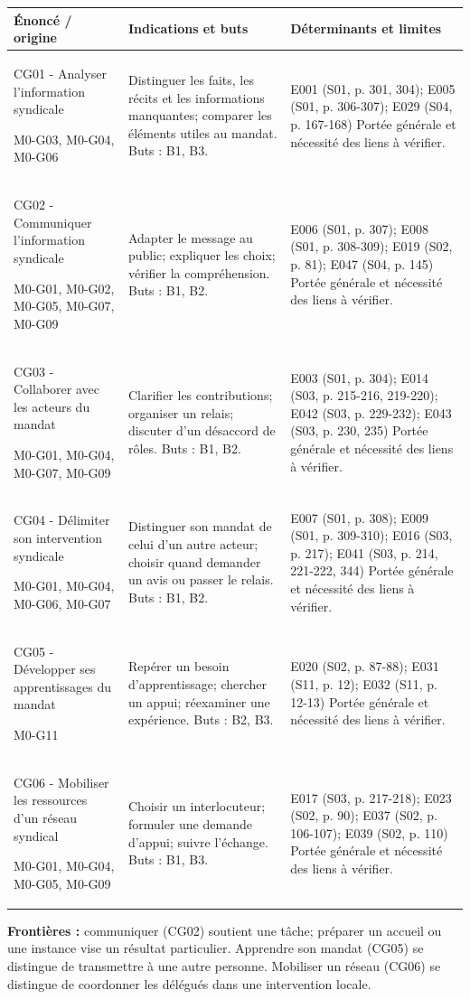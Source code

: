 \documentclass[9pt,a4paper,landscape]{extarticle}
\begin{document}
\renewcommand{\arraystretch}{1.15}\begin{longtable}{|p{55mm}|p{95mm}|p{110mm}|}\hline\rowcolor{pale}\textbf{Énoncé / origine} & \textbf{Indications et buts} & \textbf{Déterminants et limites}\\\hline\endhead
CG01 - Analyser l’information syndicale\par M0-G03, M0-G04, M0-G06 & Distinguer les faits, les récits et les informations manquantes; comparer les éléments utiles au mandat. Buts : B1, B3. & E001 (S01, p. 301, 304); E005 (S01, p. 306-307); E029 (S04, p. 167-168) Portée générale et nécessité des liens à vérifier.\\\hline
CG02 - Communiquer l’information syndicale\par M0-G01, M0-G02, M0-G05, M0-G07, M0-G09 & Adapter le message au public; expliquer les choix; vérifier la compréhension. Buts : B1, B2. & E006 (S01, p. 307); E008 (S01, p. 308-309); E019 (S02, p. 81); E047 (S04, p. 145) Portée générale et nécessité des liens à vérifier.\\\hline
CG03 - Collaborer avec les acteurs du mandat\par M0-G01, M0-G04, M0-G07, M0-G09 & Clarifier les contributions; organiser un relais; discuter d’un désaccord de rôles. Buts : B1, B2. & E003 (S01, p. 304); E014 (S03, p. 215-216, 219-220); E042 (S03, p. 229-232); E043 (S03, p. 230, 235) Portée générale et nécessité des liens à vérifier.\\\hline
CG04 - Délimiter son intervention syndicale\par M0-G01, M0-G04, M0-G06, M0-G07 & Distinguer son mandat de celui d’un autre acteur; choisir quand demander un avis ou passer le relais. Buts : B1, B2. & E007 (S01, p. 308); E009 (S01, p. 309-310); E016 (S03, p. 217); E041 (S03, p. 214, 221-222, 344) Portée générale et nécessité des liens à vérifier.\\\hline
CG05 - Développer ses apprentissages du mandat\par M0-G11 & Repérer un besoin d’apprentissage; chercher un appui; réexaminer une expérience. Buts : B2, B3. & E020 (S02, p. 87-88); E031 (S11, p. 12); E032 (S11, p. 12-13) Portée générale et nécessité des liens à vérifier.\\\hline
CG06 - Mobiliser les ressources d’un réseau syndical\par M0-G01, M0-G04, M0-G05, M0-G09 & Choisir un interlocuteur; formuler une demande d’appui; suivre l’échange. Buts : B1, B3. & E017 (S03, p. 217-218); E023 (S02, p. 90); E037 (S02, p. 106-107); E039 (S02, p. 110) Portée générale et nécessité des liens à vérifier.\\\hline
\end{longtable}\textbf{Frontières :} communiquer (CG02) soutient une tâche; préparer un accueil ou une instance vise un résultat particulier. Apprendre son mandat (CG05) se distingue de transmettre à une autre personne. Mobiliser un réseau (CG06) se distingue de coordonner les délégués dans une intervention locale.\par
\end{document}
